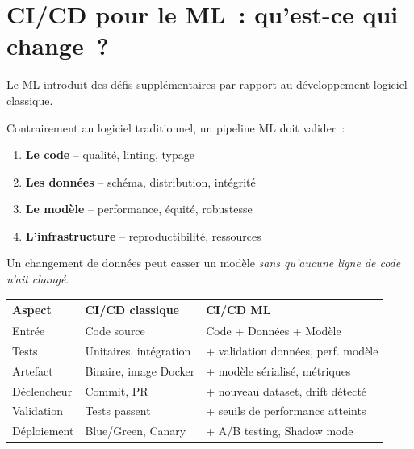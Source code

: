 \section{CI/CD pour le ML~: qu'est-ce qui change~?}
\label{sec:cicd-ml-specifics}

Le ML introduit des d\'efis suppl\'ementaires par rapport au d\'eveloppement logiciel classique.

\begin{attention}[title=\textbf{Sp\'ecificit\'es du CI/CD en ML}]
Contrairement au logiciel traditionnel, un pipeline ML doit valider~:
\begin{enumerate}
    \item \textbf{Le code} -- qualit\'e, linting, typage
    \item \textbf{Les donn\'ees} -- sch\'ema, distribution, int\'egrit\'e
    \item \textbf{Le mod\`ele} -- performance, \'equit\'e, robustesse
    \item \textbf{L'infrastructure} -- reproductibilit\'e, ressources
\end{enumerate}
Un changement de donn\'ees peut casser un mod\`ele \emph{sans qu'aucune ligne de code n'ait chang\'e}.
\end{attention}

\begin{formules}[title=\textbf{Diff\'erences CI/CD classique vs ML}]
\begin{center}
\begin{tabular}{lll}
\toprule
\textbf{Aspect} & \textbf{CI/CD classique} & \textbf{CI/CD ML} \\
\midrule
Entr\'ee & Code source & Code + Donn\'ees + Mod\`ele \\
Tests & Unitaires, int\'egration & + validation donn\'ees, perf. mod\`ele \\
Artefact & Binaire, image Docker & + mod\`ele s\'erialis\'e, m\'etriques \\
D\'eclencheur & Commit, PR & + nouveau dataset, drift d\'etect\'e \\
Validation & Tests passent & + seuils de performance atteints \\
D\'eploiement & Blue/Green, Canary & + A/B testing, Shadow mode \\
\bottomrule
\end{tabular}
\end{center}
\end{formules}

